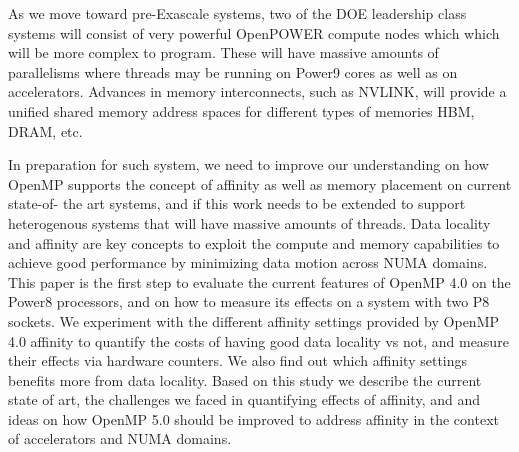 As we move toward pre-Exascale systems, two of the DOE leadership class systems will consist of very powerful OpenPOWER compute nodes which which will be more complex to program. These will have massive amounts of parallelisms where threads may be running on Power9 cores as well as on accelerators. Advances in memory interconnects, such as NVLINK, will provide a unified shared memory address spaces for different types of memories HBM, DRAM, etc.

In preparation for such system, we need to improve our understanding on how OpenMP supports the concept of affinity as well as memory placement on current state-of-
the art systems, and if this work needs to be extended to support heterogenous systems that will have massive amounts of threads. Data locality and affinity are key 
concepts to exploit the compute and memory capabilities to achieve good performance by minimizing data motion across NUMA domains. This  paper is the first step to 
evaluate the current features of OpenMP 4.0 on the Power8 processors, and on how to measure its effects on a system with two P8 sockets. We experiment with the 
different affinity settings provided by OpenMP 4.0 affinity to quantify the costs of having good data locality vs not,  and measure their effects via hardware counters. We also 
find out which affinity settings benefits more from data locality. Based on this study we describe the current state of art, the challenges we faced in quantifying effects of 
affinity, and and ideas on how OpenMP 5.0 should be improved to address affinity in the context of accelerators and NUMA domains.

